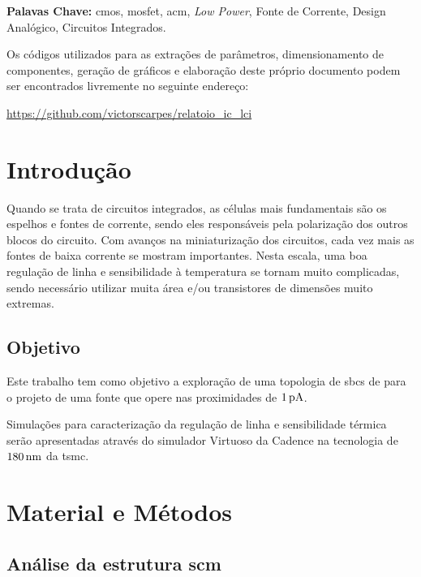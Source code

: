 \documentclass[10pt,a4paper]{extreport}
\newcommand{\?}{\stackrel{?}{=}}
\newcommand{\sis}[2]{\complexnum{#1}\,\si[per-mode=symbol]{#2}}
\begin{document}
\textbf{Palavas Chave:} \acrshort{cmos}, \acrshort{mosfet}, \acrshort{acm}, \textit{Low Power}, Fonte de Corrente, Design Analógico, Circuitos Integrados.

\newpage
{}
\listoffigures
\newpage
{}
\printglossary[type=\acronymtype, title=Lista de Siglas e Acrônimos]


\newpage
Os códigos utilizados para as extrações de parâmetros, dimensionamento de componentes, geração de gráficos e elaboração deste próprio documento podem ser encontrados livremente no seguinte endereço:

\url{https://github.com/victorscarpes/relatoio_ic_lci}

\newpage

\setcounter{chapter}{0}
\chapter{Introdução}

Quando se trata de circuitos integrados, as células mais fundamentais são os espelhos e fontes de corrente, sendo eles responsáveis pela polarização dos outros blocos do circuito. Com avanços na miniaturização dos circuitos, cada vez mais as fontes de baixa corrente se mostram importantes. Nesta escala, uma boa regulação de linha e sensibilidade à temperatura se tornam muito complicadas, sendo necessário utilizar muita área e/ou transistores de dimensões muito extremas.

\section{Objetivo}

Este trabalho tem como objetivo a exploração de uma topologia de \acrfull{sbcs} de \cite{sbcs} para o projeto de uma fonte que opere nas proximidades de $\sis{1}{\pico\ampere}$.

Simulações para caracterização da regulação de linha e sensibilidade térmica serão apresentadas através do simulador Virtuoso da Cadence na tecnologia de $\sis{180}{\nano\meter}$ da \acrfull{tsmc}.

\chapter{Material e Métodos}
\section{Análise da estrutura \acrshort{scm}}
\end{document}
